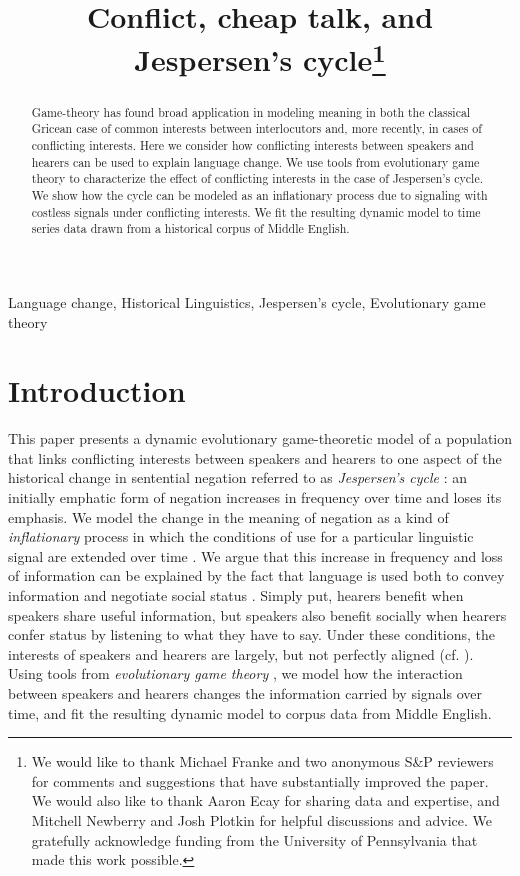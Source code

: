 \documentclass[linguex]{sp}
\title[Conflict, cheap talk, and Jespersen's cycle]{Conflict, cheap talk, and Jespersen's cycle\thanks{We would like to thank Michael Franke and two anonymous S\&P reviewers for comments and suggestions that have substantially improved the paper. We would also like to thank Aaron Ecay for sharing data and expertise, and Mitchell Newberry and Josh Plotkin for helpful discussions and advice. We gratefully acknowledge funding from the University of Pennsylvania that made this work possible.}}
\author[Ahern \& Clark]{ 
  \spauthor{Christopher Ahern \\ \institute{Department of Linguistics,\\ University of Pennsylvania}} \AND
  \spauthor{Robin Clark \\ \institute{Department of Linguistics,\\ University of Pennsylvania}}
}
\theoremstyle{definition} \newtheorem{definition}{Definition}
\begin{document}
\maketitle

\begin{abstract}
Game-theory has found broad application in modeling meaning in both the classical Gricean case of common interests between interlocutors and, more recently, in cases of conflicting interests. Here we consider how conflicting interests between speakers and hearers can be used to explain language change. We use tools from  evolutionary game theory to characterize the effect of conflicting interests in the case of Jespersen's cycle.  We show how the cycle can be modeled as an inflationary process due to signaling with costless signals under conflicting interests. We fit the resulting dynamic model to time series data drawn from a historical corpus of Middle English.
\end{abstract}

\begin{keywords}
	 Language change, Historical Linguistics, Jespersen's cycle, Evolutionary game theory
\end{keywords}


\section{Introduction}
\label{Introduction}


This paper presents a dynamic evolutionary game-theoretic model of a population that links conflicting interests between speakers and hearers to one aspect of the historical change in sentential negation referred to as \emph{Jespersen's cycle} \citeyearpar{jespersen:1917}: an initially emphatic form of negation increases in frequency over time and  loses its emphasis. We model the change in the meaning of negation as a kind of \emph{inflationary} process in which the conditions of use for a particular linguistic signal are extended over time \citep{dahl:2001}. We argue that this increase in frequency and loss of information can be explained by the fact that language is used both to convey information and negotiate social status \citep{dessalles2007,franke-etal:2012}. Simply put, hearers benefit when speakers share useful information, but  speakers also benefit socially when hearers confer status by listening to what they have to say. Under these conditions, the interests of speakers and hearers are largely, but not perfectly aligned (cf. \citealt{benz-jager-van-rooij:2006, franke-etal:2012, de-jaegher-van-rooij:2014, asher2013strategic}). Using tools from \emph{evolutionary game theory} \citep{maynard-smith1982, hofbauer-sigmund1998}, we model how the interaction between speakers and hearers changes the information carried by signals over time, and fit the resulting dynamic model to corpus data from Middle English.
\end{document}
